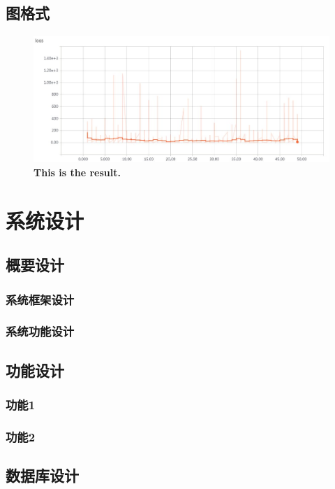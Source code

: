 \documentclass[12pt]{article}
\begin{document}
\subsection{图格式}
\begin{figure}[ht!]
\centering
\includegraphics[scale=0.5]{./loss.jpg}
\caption{\bf{This is the result.}}
\end{figure}



\section{系统设计}
\subsection{概要设计}
\subsubsection{系统框架设计}
\subsubsection{系统功能设计}
\subsection{功能设计}
\subsubsection{功能1}
\subsubsection{功能2}
\subsection{数据库设计}
\end{document}
